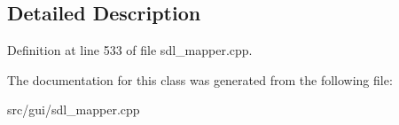 \subsection{Detailed Description}


Definition at line 533 of file sdl\-\_\-mapper.\-cpp.



The documentation for this class was generated from the following file\-:\begin{DoxyCompactItemize}
\item 
src/gui/sdl\-\_\-mapper.\-cpp\end{DoxyCompactItemize}
